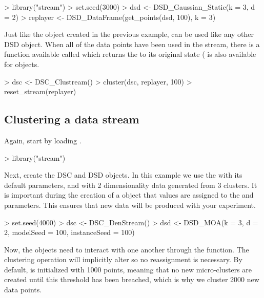 \documentclass[nojss]{jss}
\begin{document}
\begin{Schunk}
\begin{Sinput}
> library("stream")
> set.seed(3000)
> dsd <- DSD_Gaussian_Static(k = 3, d = 2)
> replayer <- DSD_DataFrame(get_points(dsd, 100), k = 3)
\end{Sinput}
\end{Schunk}

Just like the  object created in the previous example,  can be used like any other DSD object. When all of the data points have been used in the stream, there is a function available called  which returns the  to its original state ( is also available for  objects. 

\begin{Schunk}
\begin{Sinput}
> dsc <- DSC_Clustream()
> cluster(dsc, replayer, 100)
> reset_stream(replayer)
\end{Sinput}
\end{Schunk}

\subsection{Clustering a data stream}
\label{examples:clustering_ds}

Again, start by loading .

\begin{Schunk}
\begin{Sinput}
> library("stream")
\end{Sinput}
\end{Schunk}

Next, create the DSC and DSD objects. In this example we use the  with its default parameters, and  with 2 dimensionality data generated from 3 clusters. It is important during the creation of a  object that values are assigned to the  and  parameters. This ensures that new data will be produced with your experiment.

\begin{Schunk}
\begin{Sinput}
> set.seed(4000)
> dsc <- DSC_DenStream()
> dsd <- DSD_MOA(k = 3, d = 2, modelSeed = 100, instanceSeed = 100)
\end{Sinput}
\end{Schunk}

Now, the objects need to interact with one another through the  function. The clustering operation will implicitly alter  so no reassignment is necessary. By default,  is initialized with 1000 points, meaning that no new micro-clusters are created until this threshold has been breached, which is why we cluster 2000 new data points.
\end{document}
